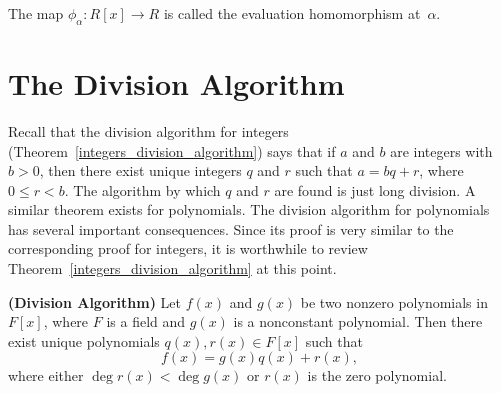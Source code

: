 \medskip

The map  $\phi_{\alpha} : R[x] \rightarrow R$ is called the {\bfi evaluation homomorphism\/} at~$\alpha$. 
 

\section{The Division Algorithm}

Recall that the division algorithm for integers (Theorem~\ref{integers_division_algorithm}) says
that if $a$ and $b$ are integers with $b>0$, then there exist unique
integers $q$ and $r$ such that $a = bq+r$, where $0 \leq r < b$. The
algorithm by which $q$ and $r$ are found is just long division.  A
similar theorem exists for polynomials.	The division algorithm for
polynomials has several important consequences. Since its proof is
very similar to the corresponding proof for integers, it is worthwhile
to review Theorem~\ref{integers_division_algorithm} at this point.  
 
 
\begin{theorem} 
{\bf (Division Algorithm)} Let $f(x)$ and $g(x)$ be two
nonzero polynomials in $F[x]$, where $F$ is a field and  $g(x)$ is a
nonconstant polynomial.  Then there exist unique polynomials $q(x),
r(x) \in F[x]$ such that 
\[
f(x) = g(x) q(x) + r(x),
\]
where either  $\deg r(x) < \deg g(x)$ or $r(x)$ is the zero
polynomial. 
\end{theorem}
 

